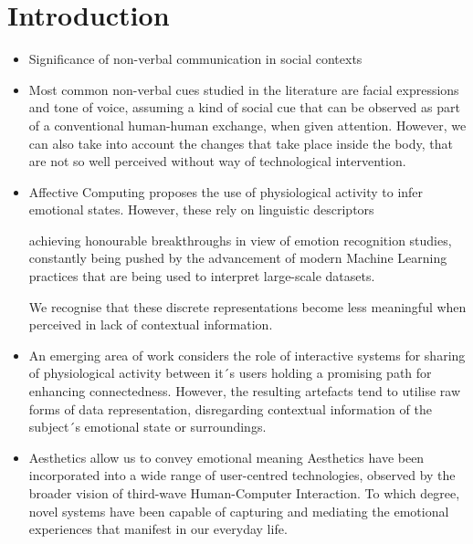 

\chapter{Introduction}
\label{sec:objectives}

\begin{itemize}
  \item Significance of non-verbal communication in social contexts

  \item Most common non-verbal cues studied in the literature are facial expressions and tone of voice, assuming a kind of social cue that can be observed as part of a conventional human-human exchange, when given attention. However, we can also take into account the changes that take place inside the body, that are not so well perceived without way of technological intervention.

  \item Affective Computing proposes the use of physiological activity to infer emotional states. However, these rely on linguistic descriptors

  achieving honourable breakthroughs in view of emotion recognition studies, constantly being pushed by the advancement of modern Machine Learning practices that are being used to interpret large-scale datasets.

  We recognise that these discrete representations become less meaningful when perceived in lack of contextual information.

  \item An emerging area of work considers the role of interactive systems for sharing of physiological activity  between it´s users holding a promising path for enhancing connectedness. However, the resulting artefacts tend to utilise raw forms of data representation, disregarding contextual information of the subject´s emotional state or surroundings.

  \item Aesthetics allow us to convey emotional meaning
  Aesthetics have been incorporated into a wide range of user-centred technologies, observed by the broader vision of third-wave Human-Computer Interaction. To which degree, novel systems have been capable of capturing and mediating the emotional experiences that manifest in our everyday life.
\end{itemize}

